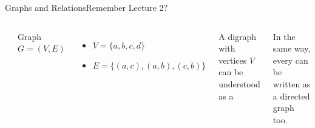\begin{frame}{Graphs and Relations}{Remember Lecture 2?}

  \begin{columns}
    \begin{center}
    \end{center}

    Graph $G = (V, E)$
    \begin{itemize}
      \item $V = \{a,b,c,d\}$
      \item $E = \{(a,c),(a,b),(c,b)\}$
    \end{itemize}\bigskip

    A digraph with vertices $V$ can be understood as a \bigskip

    In the same way, every  can be written as a directed graph too.
  \end{columns}
\end{frame}

